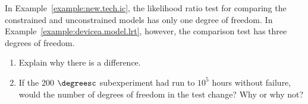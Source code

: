 \begin{exercise1}
In Example~\ref{example:new.tech.ic}, the likelihood ratio test for
comparing the constrained and unconstrained models has only one
degree of freedom. In Example~\ref{example:devicea.model.lrt},
however, the comparison test has three degrees of freedom.
\begin{enumerate}
\item
Explain why there is a difference.
\item
If the 200 $\degreesc$ subexperiment had run to $10^{5}$ hours
without failure, would the number of degrees of freedom in the test
change?  Why or why not?
\end{enumerate}
\end{exercise1}


